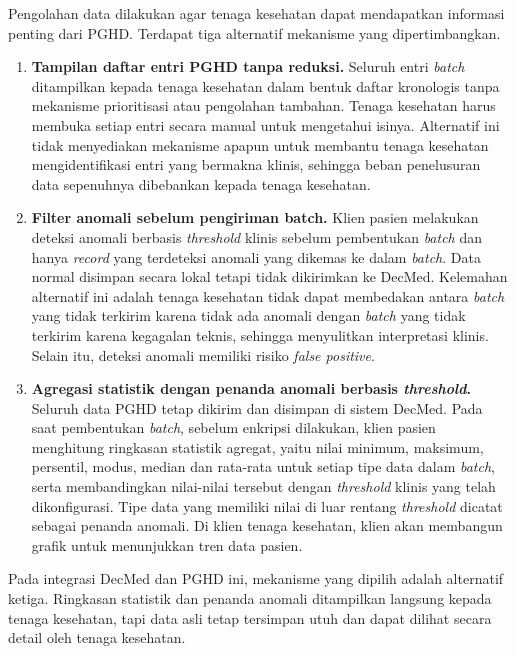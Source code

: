 Pengolahan data dilakukan agar tenaga kesehatan dapat mendapatkan informasi penting dari PGHD\@.
Terdapat tiga alternatif mekanisme yang dipertimbangkan.

\begin{enumerate}
    \item \textbf{Tampilan daftar entri PGHD tanpa reduksi.} 
    Seluruh entri \textit{batch} ditampilkan kepada tenaga kesehatan dalam bentuk daftar kronologis tanpa mekanisme prioritisasi atau pengolahan tambahan. 
    Tenaga kesehatan harus membuka setiap entri secara manual untuk mengetahui isinya. 
    Alternatif ini tidak menyediakan mekanisme apapun untuk membantu tenaga kesehatan mengidentifikasi entri yang bermakna klinis, sehingga beban penelusuran data sepenuhnya dibebankan kepada tenaga kesehatan.

    \item \textbf{Filter anomali sebelum pengiriman batch.} 
    Klien pasien melakukan deteksi anomali berbasis \textit{threshold} klinis sebelum pembentukan \textit{batch} dan hanya \textit{record} yang terdeteksi anomali yang dikemas ke dalam \textit{batch}. 
    Data normal disimpan secara lokal tetapi tidak dikirimkan ke DecMed. 
    Kelemahan alternatif ini adalah tenaga kesehatan tidak dapat membedakan antara \textit{batch} yang tidak terkirim karena tidak ada anomali dengan \textit{batch} yang tidak terkirim karena kegagalan teknis, sehingga menyulitkan interpretasi klinis. 
    Selain itu, deteksi anomali memiliki risiko \textit{false positive}.

    \item \textbf{Agregasi statistik dengan penanda anomali berbasis \textit{threshold}.} 
    Seluruh data PGHD tetap dikirim dan disimpan di sistem DecMed. 
    Pada saat pembentukan \textit{batch}, sebelum enkripsi dilakukan, klien pasien menghitung ringkasan statistik agregat, yaitu nilai minimum, maksimum, persentil, modus, median dan rata-rata untuk setiap tipe data dalam \textit{batch}, serta membandingkan nilai-nilai tersebut dengan \textit{threshold} klinis yang telah dikonfigurasi. 
    Tipe data yang memiliki nilai di luar rentang \textit{threshold} dicatat sebagai penanda anomali. 
    Di klien tenaga kesehatan, klien akan membangun grafik untuk menunjukkan tren data pasien.
\end{enumerate}

Pada integrasi DecMed dan PGHD ini, mekanisme yang dipilih adalah alternatif ketiga. 
Ringkasan statistik dan penanda anomali ditampilkan langsung kepada tenaga kesehatan, tapi data asli tetap tersimpan utuh dan dapat dilihat secara detail oleh tenaga kesehatan. 

